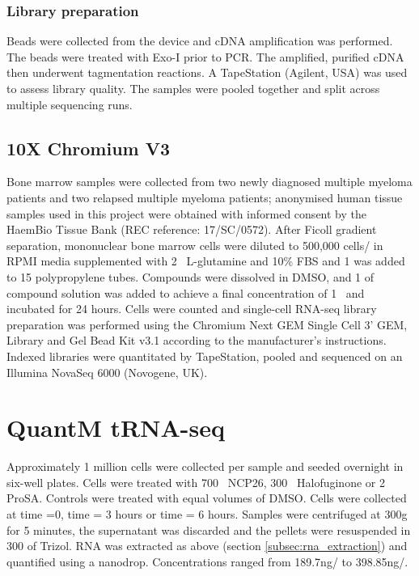 \subsubsection{Library preparation}
Beads were collected from the device and cDNA amplification was performed.
The beads were treated with Exo-I prior to PCR.
The amplified, purified cDNA then underwent tagmentation reactions.
A TapeStation (Agilent, USA) was used to assess library quality.
The samples were pooled together and split across multiple sequencing runs.

\subsection{10X Chromium V3}\label{subsec:10x_method}
Bone marrow samples were collected from two newly diagnosed multiple myeloma patients and two relapsed multiple myeloma patients;
anonymised human tissue samples used in this project were obtained with informed consent by the HaemBio Tissue Bank (REC reference: 17/SC/0572).
After Ficoll gradient separation, mononuclear bone marrow cells were diluted to 500,000 cells/\ml{} in RPMI media supplemented with 2\si{\milli\Molar}
L-glutamine and 10\% FBS and 1\ml{} was added to 15\ml{} polypropylene tubes.
Compounds were dissolved in DMSO, and 1\ul{} of compound solution was added to achieve a final concentration of 1\si{\micro\Molar} and incubated for 24 hours.
Cells were counted and single-cell RNA-seq library preparation was performed using the Chromium Next GEM Single Cell 3' GEM, Library and Gel Bead Kit v3.1 according to the manufacturer's instructions.
Indexed libraries were quantitated by TapeStation, pooled and sequenced on an Illumina NovaSeq 6000 (Novogene, UK).

\section{QuantM tRNA-seq}
Approximately 1 million cells were collected per sample and seeded overnight in six-well plates.
Cells were treated with 700\si{\nano\Molar} NCP26, 300\si{\nano\Molar} Halofuginone or 2\si{\micro\Molar} ProSA.
Controls were treated with equal volumes of DMSO.
Cells were collected at time =0, time = 3 hours or time = 6 hours.
Samples were centrifuged at 300g for 5 minutes, the supernatant was discarded and the pellets were resuspended in 300\ul{} of Trizol.
RNA was extracted as above (section \ref{subsec:rna_extraction}) and quantified using a nanodrop.
Concentrations ranged from  189.7\si{\ng}/\ul{} to 398.85\si{\ng}/\ul{}.

